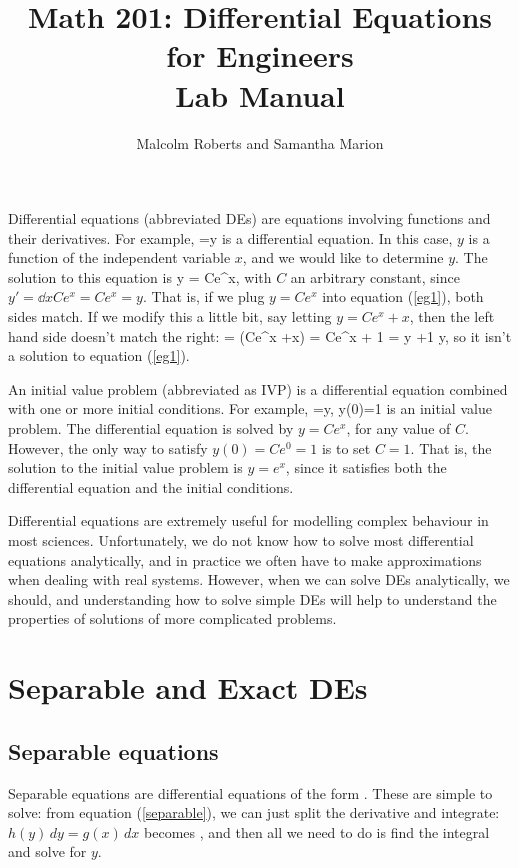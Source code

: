 \documentclass[12pt]{book}
\title{Math 201: Differential Equations for Engineers\\Lab Manual}
\author{Malcolm Roberts and Samantha Marion}
\begin{document}
\maketitle

Differential equations (abbreviated DEs) are equations involving functions and 
their derivatives. For example, 
\be \label{eg1}
 =y
\ee
is a differential equation. In this case, $y$ is a function of the independent 
variable $x$, and we would like to determine $y$. The solution to this
equation is
\bee
y = Ce^x,
\eee
with $C$ an arbitrary constant, since $y'=\dd{}{x}Ce^x=Ce^x=y$. That is, if we 
plug $y=Ce^x$ into equation (\ref{eg1}), both sides match. If we modify this
a little bit, say letting $y=Ce^x +x$, then the left hand side doesn't
match the right:
\bee
{} = (Ce^x +x) = Ce^x + 1 = y +1 \neq y,
\eee
so it isn't a solution to equation (\ref{eg1}).

An initial value problem (abbreviated as IVP) is a differential equation 
combined with one or more initial conditions. For example,
\bee
{}=y, \qquad y(0)=1
\eee
is an initial value problem.
The differential equation is solved by $y=Ce^x$, for any value of $C$. However,
the only way to satisfy $y(0)=Ce^0=1$ is to set $C=1$. That is, the solution
to the initial value problem is $y=e^x$, since it satisfies both the 
differential equation and the initial conditions.

Differential equations are extremely useful for modelling complex behaviour in 
most sciences. Unfortunately, we do not know how to solve most
differential equations analytically, and in practice we often have to 
make approximations when dealing with real systems. However, when we can solve
DEs analytically, we should, and understanding how to solve simple DEs will
help to understand the properties of solutions of more complicated problems.



\chapter{Separable and Exact DEs}


\section{Separable equations}

Separable equations are differential equations of the form
\be \label{separable}
.
\ee
These are simple to solve: from equation (\ref{separable}), we can just split
the derivative and integrate: $ h(y)\, dy = g(x) \, dx$ becomes
\bee
{},
\eee
and then all we need to do is find the integral and solve for $y$.\\
\end{document}
